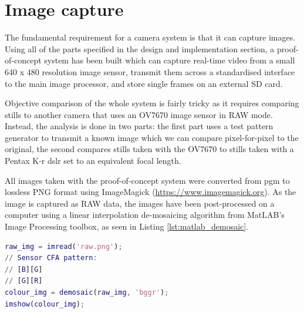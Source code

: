 \section{Image capture}
The fundamental requirement for a camera system is that it can capture images. Using all of the parts specified in the design and implementation section, a proof-of-concept system has been built which can capture real-time video from a small 640 x 480 resolution image sensor, transmit them across a standardised interface to the main image processor, and store single frames on an external SD card.

Objective comparison of the whole system is fairly tricky as it requires comparing stills to another camera that uses an OV7670 image sensor in RAW mode. Instead, the analysis is done in two parts: the first part uses a test pattern generator to transmit a known image which we can compare pixel-for-pixel to the original, the second compares stills taken with the OV7670 to stills taken with a Pentax K-r \gls{dslr} set to an equivalent focal length.

All images taken with the proof-of-concept system were converted from \gls{pgm} to lossless PNG format using ImageMagick (\url{https://www.imagemagick.org}). As the image is captured as RAW data, the images have been post-processed on a computer using a linear interpolation de-mosaicing algorithm from MatLAB's Image Processing toolbox, as seen in Listing \ref{lst:matlab_demosaic}.

\begin{lstlisting}[caption={MatLAB's linear interpolation demosaicing algorithm.}, label={lst:matlab_demosaic}, language=Matlab]
raw_img = imread('raw.png');
// Sensor CFA pattern:
// [B][G]
// [G][R]
colour_img = demosaic(raw_img, 'bggr');
imshow(colour_img);
\end{lstlisting}

